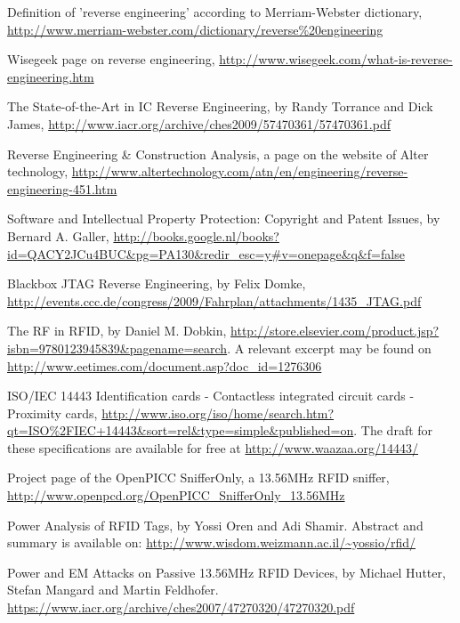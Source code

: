 \documentclass{llncs}
\begin{document}

\begin{thebibliography}{1}

Definition of 'reverse engineering' according to Merriam-Webster dictionary, 
\url{http://www.merriam-webster.com/dictionary/reverse\%20engineering}

Wisegeek page on reverse engineering,
\url{http://www.wisegeek.com/what-is-reverse-engineering.htm}

The State-of-the-Art in IC Reverse Engineering, by Randy Torrance and Dick James,
\url{http://www.iacr.org/archive/ches2009/57470361/57470361.pdf}

Reverse Engineering \& Construction Analysis, a page on the website of Alter technology, 
\url{http://www.altertechnology.com/atn/en/engineering/reverse-engineering-451.htm}

Software and Intellectual Property Protection: Copyright and Patent Issues, by Bernard A. Galler, 
\url{http://books.google.nl/books?id=QACY2JCu4BUC&pg=PA130&redir_esc=y#v=onepage&q&f=false}

Blackbox JTAG Reverse Engineering, by Felix Domke,
\url{http://events.ccc.de/congress/2009/Fahrplan/attachments/1435_JTAG.pdf}

The RF in RFID, by Daniel M. Dobkin, 
\url{http://store.elsevier.com/product.jsp?isbn=9780123945839&pagename=search}. A relevant excerpt may be found on 
\url{http://www.eetimes.com/document.asp?doc_id=1276306}

ISO/IEC 14443 Identification cards - Contactless integrated circuit cards - Proximity cards,
\url{http://www.iso.org/iso/home/search.htm?qt=ISO\%2FIEC+14443&sort=rel&type=simple&published=on}. The draft for these specifications are available for free at \url{http://www.waazaa.org/14443/}

Project page of the OpenPICC SnifferOnly, a 13.56MHz RFID sniffer,
\url{http://www.openpcd.org/OpenPICC_SnifferOnly_13.56MHz}

Power Analysis of RFID Tags, by Yossi Oren and Adi Shamir. Abstract and summary is available on:
\url{http://www.wisdom.weizmann.ac.il/~yossio/rfid/}

Power and EM Attacks on Passive 13.56MHz RFID Devices, by Michael Hutter, Stefan Mangard and Martin Feldhofer. 
\url{https://www.iacr.org/archive/ches2007/47270320/47270320.pdf}


\end{thebibliography}
\end{document}

